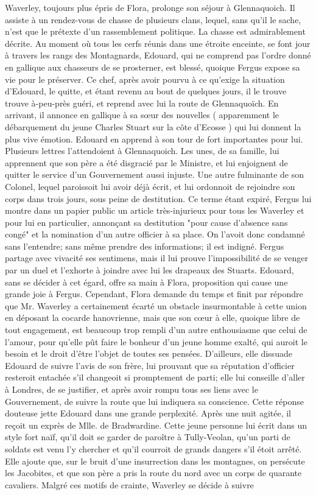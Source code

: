 Waverley, toujours plus épris de Flora, prolonge son séjour à Glennaquoich. Il assiste à un rendez-vous de chasse de plusieurs clans, lequel, sans qu'il le sache, n'est que le prétexte d'un rassemblement politique. La chasse est admirablement décrite. Au moment où tous les cerfs réunis dans une étroite enceinte, se font jour à travers les rangs des Montagnards, Edouard, qui ne comprend pas l'ordre donné en gallique aux chasseurs de se prosterner, est blessé, quoique Fergus expose sa vie pour le préserver. Ce chef, après avoir pourvu à ce qu'exige la situation d'Edouard, le quitte, et étant revenu au bout de quelques jours, il le trouve\setcounter{page}{129} trouve à-peu-près guéri, et reprend avec lui la route de Glennaquoïch. En arrivant, il annonce en gallique à sa sœur des nouvelles ( apparemment le débarquement du jeune Charles Stuart sur la côte d'Ecosse ) qui lui donnent la plus vive émotion. Edouard en apprend à son tour de fort importantes pour lui. Plusieurs lettres l'attendoient à Glennaquoich. Les unes, de sa famille, lui apprennent que son père a été disgracié par le Ministre, et lui enjoignent de quitter le service d'un Gouvernement aussi injuste. Une autre fulminante de son Colonel, lequel paroissoit lui avoir déjà écrit, et lui ordonnoit de rejoindre son corps dans trois jours, sous peine de destitution. Ce terme étant expiré, Fergus lui montre dans un papier public un article très-injurieux pour tous les Waverley et pour lui en particulier, annonçant sa destitution "pour cause d'absence sans congé" et la nomination d'un autre officier à sa place. On l'avoit donc condamné sans l'entendre; sans même prendre des informations; il est indigné. Fergus partage avec vivacité ses sentimens, mais il lui prouve l'impossibilité de se venger par un duel et l'exhorte à joindre avec lui les drapeaux des Stuarts. Edouard, sans se décider à cet égard, offre sa main à\setcounter{page}{130} Flora, proposition qui cause une grande joie à Fergus. Cependant, Flora demande du temps et finit par répondre que Mr. Waverley a certainement écarté un obstacle insurmontable à cette union en déposant la cocarde hanovrienne, mais que son cœur à elle, quoique libre de tout engagement, est beaucoup trop rempli d'un autre enthousiasme que celui de l'amour, pour qu'elle pût faire le bonheur d'un jeune homme exalté, qui auroit le besoin et le droit d'être l'objet de toutes ses pensées. D'ailleurs, elle dissuade Edouard de suivre l'avis de son frère, lui prouvant que sa réputation d'officier resteroit entachée s'il changeoit si promptement de parti; elle lui conseille d'aller à Londres, de se justifier, et après avoir rompu tous ses liens avec le Gouvernement, de suivre la route que lui indiquera sa conscience. Cette réponse douteuse jette Edouard dans une grande perplexité. Après une nuit agitée, il reçoit un exprès de Mlle. de Bradwardine. Cette jeune personne lui écrit dans un style fort naïf, qu'il doit se garder de paroître à Tully-Veolan, qu'un parti de soldats est venu l'y chercher et qu'il courroit de grands dangers s'il étoit arrêté. Elle ajoute que, sur le bruit d'une insurrection\setcounter{page}{131} dans les montagnes, on persécute les Jacobites, et que son père a pris la route du nord avec un corps de quarante cavaliers. Malgré ces motifs de crainte, Waverley se décide à suivre 